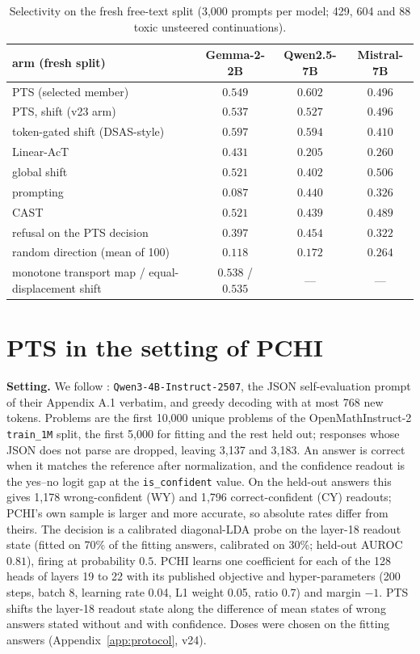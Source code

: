 \begin{table}[h]\footnotesize\setlength{\tabcolsep}{4pt}
\centering
\begin{tabular}{l|ccc}
\hline
arm (fresh split) & Gemma-2-2B & Qwen2.5-7B & Mistral-7B \\
\hline
PTS (selected member) & $0.549$ & $0.602$ & $0.496$ \\
PTS, shift (v23 arm) & $0.537$ & $0.527$ & $0.496$ \\
token-gated shift (DSAS-style) & $0.597$ & $0.594$ & $0.410$ \\
Linear-AcT & $0.431$ & $0.205$ & $0.260$ \\
global shift & $0.521$ & $0.402$ & $0.506$ \\
prompting & $0.087$ & $0.440$ & $0.326$ \\
CAST & $0.521$ & $0.439$ & $0.489$ \\
refusal on the PTS decision & $0.397$ & $0.454$ & $0.322$ \\
random direction (mean of 100) & $0.118$ & $0.172$ & $0.264$ \\
monotone transport map / equal-displacement shift & $0.538$ / $0.535$ & --- & --- \\
\hline
\end{tabular}
\caption{Selectivity on the fresh free-text split (3{,}000 prompts per model;
429, 604 and 88 toxic unsteered continuations).}
\label{tab:fresh}
\end{table}

\section{PTS in the setting of PCHI}
\label{app:pchi}

\textbf{Setting.} We follow \citet{liu2026probe}: \texttt{Qwen3-4B-Instruct-2507},
the JSON self-evaluation prompt of their Appendix A.1 verbatim, and greedy
decoding with at most 768 new tokens. Problems are the first 10{,}000 unique
problems of the OpenMathInstruct-2 \texttt{train\_1M} split, the first 5{,}000
for fitting and the rest held out; responses whose JSON does not parse are
dropped, leaving 3{,}137 and 3{,}183. An answer is correct when it matches the
reference after normalization, and the confidence readout is the yes--no logit
gap at the \texttt{is\_confident} value. On the held-out answers this gives
1{,}178 wrong-confident (WY) and 1{,}796 correct-confident (CY) readouts;
PCHI's own sample is larger and more accurate, so absolute rates differ from
theirs. The decision is a calibrated diagonal-LDA probe on the layer-18 readout
state (fitted on 70\% of the fitting answers, calibrated on 30\%; held-out AUROC
$0.81$), firing at probability $0.5$. PCHI learns one coefficient for each of
the 128 heads of layers 19 to 22 with its published objective and
hyper-parameters (200 steps, batch 8, learning rate 0.04, L1 weight 0.05, ratio
0.7) and margin $-1$. PTS shifts the layer-18 readout state along the
difference of mean states of wrong answers stated without and with confidence.
Doses were chosen on the fitting answers (Appendix~\ref{app:protocol}, v24).

